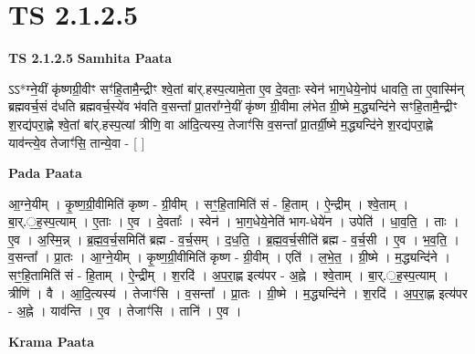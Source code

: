 \documentclass[17pt]{extarticle}
\begin{document}
\section*{ TS 2.1.2.5 }

\textbf{TS 2.1.2.5 } \newline
\textbf{Samhita Paata} \newline

ऽऽ*ग्ने॒यीं कृ॑ष्णग्री॒वीꣳ सꣳ॑हि॒तामै॒न्द्रीꣳ श्वे॒तां बा॑र्.हस्प॒त्यामे॒ता ए॒व दे॒वताः॒ स्वेन॑ भाग॒धेये॒नोप॑ धावति॒ ता ए॒वास्मि॑न् ब्रह्मवर्च॒सं द॑धति ब्रह्मवर्च॒स्ये॑व भ॑वति व॒सन्ता᳚ प्रा॒तरा᳚ग्ने॒यीं कृ॑ष्ण ग्री॒वीमा ल॑भेत ग्री॒ष्मे म॒द्ध्यन्दि॑ने सꣳहि॒तामै॒न्द्रीꣳ श॒रद्य॑परा॒ह्णे श्वे॒तां बा॑र्.हस्प॒त्यां त्रीणि॒ वा आ॑दि॒त्यस्य॒ तेजाꣳ॑सि व॒सन्ता᳚ प्रा॒तर्ग्री॒ष्मे म॒द्ध्यन्दि॑ने श॒रद्य॑परा॒ह्णे याव॑न्त्ये॒व तेजाꣳ॑सि॒ तान्ये॒वा - [  ] \newline

\textbf{Pada Paata} \newline

आ॒ग्ने॒यीम् । कृ॒ष्ण॒ग्री॒वीमिति॑ कृष्ण - ग्री॒वीम् । सꣳ॒॒हि॒तामिति॑ सं - हि॒ताम् । ऐ॒न्द्रीम् । श्वे॒ताम् । बा॒र्.॒ह॒स्प॒त्याम् । ए॒ताः । ए॒व । दे॒वताः᳚ । स्वेन॑ । भा॒ग॒धेये॒नेति॑ भाग-धेये॑न । उपेति॑ । धा॒व॒ति॒ । ताः । ए॒व । अ॒स्मि॒न्न् । ब्र॒ह्म॒व॒र्च॒समिति॑ ब्रह्म - व॒र्च॒सम् । द॒ध॒ति॒ । ब्र॒ह्म॒व॒र्च॒सीति॑ ब्रह्म - व॒र्च॒सी । ए॒व । भ॒व॒ति॒ । व॒सन्ता᳚ । प्रा॒तः । आ॒ग्ने॒यीम् । कृ॒ष्ण॒ग्री॒वीमिति॑ कृष्ण - ग्री॒वीम् । एति॑ । ल॒भे॒त॒ । ग्री॒ष्मे । म॒द्ध्यन्दि॑ने । सꣳ॒॒हि॒तामिति॑ सं - हि॒ताम् । ऐ॒न्द्रीम् । श॒रदि॑ । अ॒प॒रा॒ह्ण इत्य॑पर - अ॒ह्ने । श्वे॒ताम् । बा॒र्.॒ह॒स्प॒त्याम् । त्रीणि॑ । वै । आ॒दि॒त्यस्य॑ । तेजाꣳ॑सि । व॒सन्ता᳚ । प्रा॒तः । ग्री॒ष्मे । म॒द्ध्यन्दि॑ने । श॒रदि॑ । अ॒प॒रा॒ह्ण इत्य॑पर - अ॒ह्ने । याव॑न्ति । ए॒व । तेजाꣳ॑सि । तानि॑ । ए॒व ।  \newline


\textbf{Krama Paata} \newline
\end{document}
